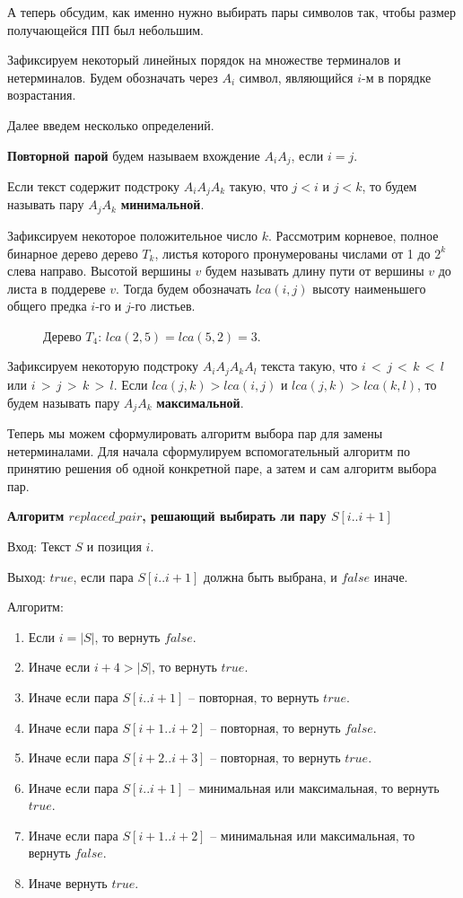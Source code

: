 \documentclass[14pt]{article}
\begin{document}
А теперь обсудим, как именно нужно выбирать пары символов так, чтобы размер получающейся ПП был небольшим.

Зафиксируем некоторый линейных порядок на множестве терминалов и нетерминалов. 
Будем обозначать через $A_i$ символ, являющийся $i$-м в порядке возрастания.

Далее введем несколько определений.

{\bf Повторной парой} будем называем вхождение $A_iA_j$, если $i = j$.

Если текст содержит подстроку $A_iA_jA_k$ такую, что $j < i$ и $j < k$, то будем называть пару $A_jA_k$ {\bf минимальной}.

Зафиксируем некоторое положительное число $k$. Рассмотрим корневое, полное бинарное дерево дерево $T_k$, листья которого
пронумерованы числами от 1 до $2^k$ слева направо. Высотой вершины $v$ будем называть длину пути от вершины $v$ до листа
в поддереве $v$. Тогда будем обозначать $lca(i, j)$ высоту наименьшего общего предка $i$-го и $j$-го листьев.

\begin{figure}[t]
	\picLCAExample{}
	\caption{Дерево $T_4$: $lca(2,5) = lca(5,2) = 3$.}
	\label{LCAExample}
\end{figure}

Зафиксируем некоторую подстроку $A_iA_jA_kA_l$ текста такую, что $i\,<\,j\,<\,k\,<\,l$ или $i\,>\,j\,>\,k\,>\,l$. Если
$lca(j, k) > lca(i, j)$ и $lca(j, k) > lca(k, l)$, то будем называть пару $A_jA_k$ {\bf максимальной}.

Теперь мы можем сформулировать алгоритм выбора пар для замены нетерминалами.
Для начала сформулируем вспомогательный алгоритм по принятию решения об одной конкретной паре,
а затем и сам алгоритм выбора пар.

{\bf Алгоритм $replaced\_pair$, решающий выбирать ли пару $S[i..i+1]$}

{\sc Вход:} Текст $S$ и позиция $i$.

{\sc Выход:} $true$, если пара $S[i..i+1]$ должна быть выбрана, и $false$ иначе.

{\sc Алгоритм:}

\begin{enumerate}
	\item Если $i = |S|$, то вернуть $false$.
	\item Иначе если $i + 4 > |S|$, то вернуть $true$.
	\item Иначе если пара $S[i..i+1]$ -- повторная, то вернуть $true$.
	\item Иначе если пара $S[i+1..i+2]$ -- повторная, то вернуть $false$.
	\item Иначе если пара $S[i+2..i+3]$ -- повторная, то вернуть $true$.
	\item Иначе если пара $S[i..i+1]$ -- минимальная или максимальная, то вернуть $true$.
	\item Иначе если пара $S[i+1..i+2]$ -- минимальная или максимальная, то вернуть $false$.
	\item Иначе вернуть $true$.
\end{enumerate}
\end{document}

